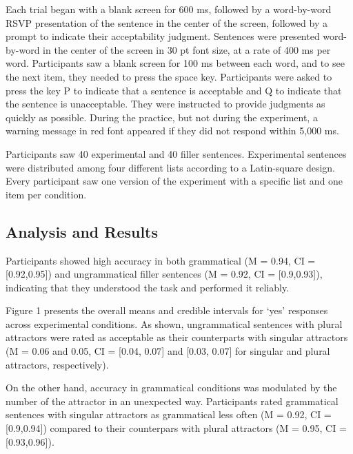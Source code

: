 \documentclass[
  authoryear,
  3p]{elsarticle}
\begin{document}
Each trial began with a blank screen for 600 ms, followed by a
word-by-word RSVP presentation of the sentence in the center of the
screen, followed by a prompt to indicate their acceptability judgment.
Sentences were presented word-by-word in the center of the screen in 30
pt font size, at a rate of 400 ms per word. Participants saw a blank
screen for 100 ms between each word, and to see the next item, they
needed to press the space key. Participants were asked to press the key
P to indicate that a sentence is acceptable and Q to indicate that the
sentence is unacceptable. They were instructed to provide judgments as
quickly as possible. During the practice, but not during the experiment,
a warning message in red font appeared if they did not respond within
5,000 ms.

Participants saw 40 experimental and 40 filler sentences. Experimental
sentences were distributed among four different lists according to a
Latin-square design. Every participant saw one version of the experiment
with a specific list and one item per condition.

\subsection{Analysis and Results}\label{analysis-and-results}

Participants showed high accuracy in both grammatical (M = 0.94, CI =
{[}0.92,0.95{]}) and ungrammatical filler sentences (M = 0.92, CI =
{[}0.9,0.93{]}), indicating that they understood the task and performed
it reliably.

Figure 1 presents the overall means and credible intervals for `yes'
responses across experimental conditions. As shown, ungrammatical
sentences with plural attractors were rated as acceptable as their
counterparts with singular attractors (M = 0.06 and 0.05, CI = {[}0.04,
0.07{]} and {[}0.03, 0.07{]} for singular and plural attractors,
respectively).

On the other hand, accuracy in grammatical conditions was modulated by
the number of the attractor in an unexpected way. Participants rated
grammatical sentences with singular attractors as grammatical less often
(M = 0.92, CI = {[}0.9,0.94{]}) compared to their counterpars with
plural attractors (M = 0.95, CI = {[}0.93,0.96{]}).
\end{document}
